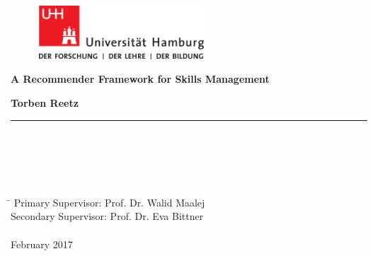 \begin{titlepage}

  \setcounter{page}{-1}

	\begin{figure}[h]
		\begin{minipage}[b]{62mm}
			\includegraphics[width=62mm]{images/unilogo}
		\end{minipage}
	\end{figure}

	\vfill

	\begin{center}
		\vspace{14mm}
		\noindent \textbf{\huge
		A Recommender Framework for Skills Management \\
		}
		\vspace{14mm}
	\end{center}

	\vfill

	\noindent \textbf{Torben Reetz} \\
	\noindent \rule{\textwidth}{0.4mm}
	 \\
	 \\
	 \\
	 \\
	\begin{tabbing}
	\hspace{8em} \=  \kill
	Primary Supervisor: Prof. Dr. Walid Maalej \\
	Secondary Supervisor: Prof. Dr. Eva Bittner \\
	~ \\
	February 2017
	\end{tabbing}


\end{titlepage}
